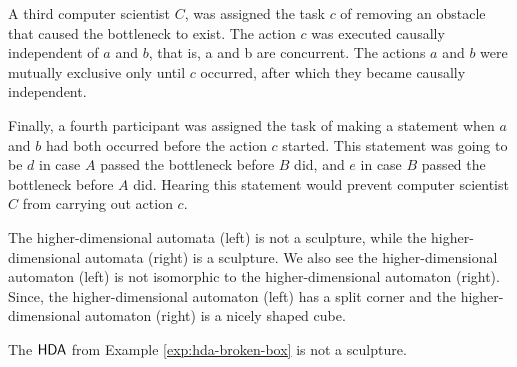 \begin{example}
        A third computer scientist $C$, was assigned the task $c$ of removing an obstacle that caused the bottleneck to exist. The action $c$ was executed causally independent of $a$ and $b$, that is, a and b are concurrent. The actions $a$ and $b$ were mutually exclusive only until $c$ occurred, after which they became causally independent.
    
        Finally, a fourth participant was assigned the task of making a statement when $a$ and $b$ had both occurred before the action $c$ started. This statement was going to be $d$ in case $A$ passed the bottleneck before $B$ did, and $e$ in case $B$ passed the bottleneck before $A$ did. Hearing this statement would prevent computer scientist $C$ from carrying out action $c$.
    
        The higher-dimensional automata (left) is not a sculpture, while the higher-dimensional automata (right) is a sculpture. We also see the higher-dimensional automaton (left) is not isomorphic to the higher-dimensional automaton (right). Since, the higher-dimensional automaton (left) has a split corner and the higher-dimensional automaton (right) is a nicely shaped cube.
    \end{example}
    
    \begin{theorem}
        \label{th:non-sculpting}
        The $\text{\textup{\textsf{HDA}}}$ from Example \ref{exp:hda-broken-box} is not a sculpture.
    \end{theorem}
    
